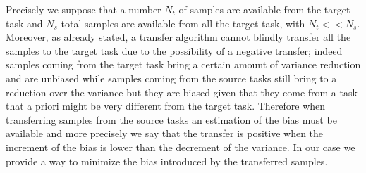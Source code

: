          \noindent Precisely we suppose that a number $N_t$ of samples are available
          from the target task and $N_s$ total samples are available from all the target task, with $N_t << N_s$.\newline
          Moreover, as already stated, a transfer algorithm cannot blindly transfer all the samples to the target
          task due to the possibility of a negative transfer; indeed samples coming from the target task bring a certain
          amount of variance reduction and are unbiased while samples coming from the source tasks still bring to a reduction
          over the variance but they are biased given that they come from a task that a priori might be very different
          from the target task. Therefore when transferring samples from the source tasks an estimation of the bias must be available
          and more precisely we say that the transfer is positive when the increment of the bias is lower than the decrement of the variance.
          In our case we provide a way to minimize the bias introduced by the transferred samples.
